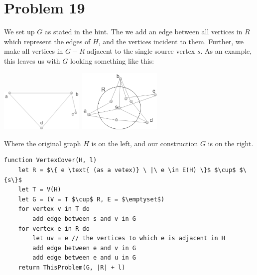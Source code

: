 \documentclass{article}
\providecommand{\prob}[1]{\section*{Problem #1}}
\begin{document}
\pagebreak
\prob{19}

We set up $G$ as stated in the hint.
The we add an edge between all vertices in $R$ which represent the edges of $H$, and the vertices incident to them.
Further, we make all vertices in $G - R$ adjacent to the single source vertex $s$.
As an example, this leaves us with $G$ looking something like this:

\begin{center}
    \includegraphics[width=0.3\textwidth]{a21p19first}
    \includegraphics[width=0.3\textwidth]{a21p19graph}
\end{center}

Where the original graph $H$ is on the left, and our construction $G$ is on the right.
\begin{lstlisting}
function VertexCover(H, l)
    let R = $\{ e \text{ (as a vetex)} \ |\ e \in E(H) \}$ $\cup$ $\{s\}$
    let T = V(H)
    let G = (V = T $\cup$ R, E = $\emptyset$)
    for vertex v in T do
        add edge between s and v in G
    for vertex e in R do
        let uv = e // the vertices to which e is adjacent in H
        add edge between e and v in G
        add edge between e and u in G
    return ThisProblem(G, |R| + l)
\end{lstlisting}
\end{document}
